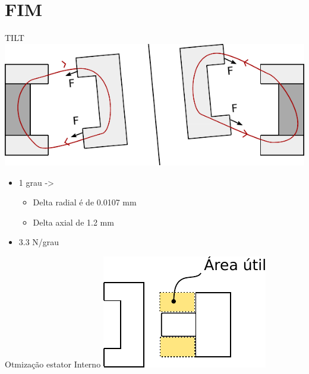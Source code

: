 \documentclass{beamer}
\begin{document}
\section{FIM}

\begin{frame}{TILT}
\centering
\includegraphics[width=0.7\linewidth]{modelo_circuito_passivo_forcas_t}

\begin{itemize}
\item 1 grau ->
\begin{itemize}
	\item Delta radial é de 0.0107 mm
	\item Delta axial de 1.2 mm
\end{itemize}
\item 3.3 N/grau
\end{itemize}

\end{frame}

\begin{frame}{Otmização estator Interno}
\centering
\includegraphics[width=0.7\linewidth]{modelo_ativo_bobina}
\end{frame}

\end{document}
